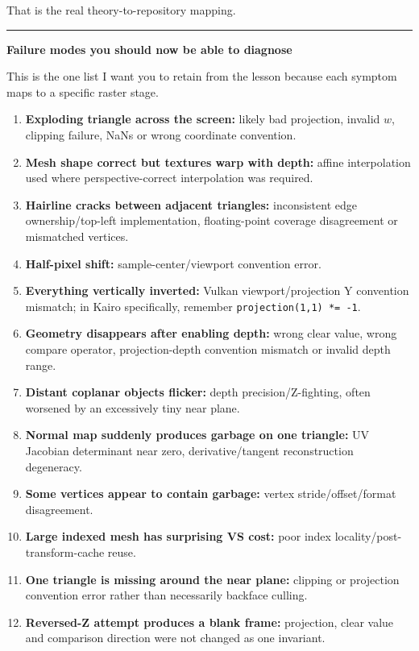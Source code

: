 That is the real theory-to-repository mapping.

\begin{center}\rule{0.5\linewidth}{0.5pt}\end{center}

\textbf{Failure modes you should now be able to diagnose}

This is the one list I want you to retain from the lesson because each symptom maps to a specific raster stage.

\begin{enumerate}
\def\labelenumi{\arabic{enumi}.}
\tightlist
\item
  \textbf{Exploding triangle across the screen:} likely bad projection, invalid \(w\), clipping failure, NaNs or wrong coordinate convention.
\item
  \textbf{Mesh shape correct but textures warp with depth:} affine interpolation used where perspective-correct interpolation was required.
\item
  \textbf{Hairline cracks between adjacent triangles:} inconsistent edge ownership/top-left implementation, floating-point coverage disagreement or mismatched vertices.
\item
  \textbf{Half-pixel shift:} sample-center/viewport convention error.
\item
  \textbf{Everything vertically inverted:} Vulkan viewport/projection Y convention mismatch; in Kairo specifically, remember \texttt{projection(1,1)\ *=\ -1}.
\item
  \textbf{Geometry disappears after enabling depth:} wrong clear value, wrong compare operator, projection-depth convention mismatch or invalid depth range.
\item
  \textbf{Distant coplanar objects flicker:} depth precision/Z-fighting, often worsened by an excessively tiny near plane.
\item
  \textbf{Normal map suddenly produces garbage on one triangle:} UV Jacobian determinant near zero, derivative/tangent reconstruction degeneracy.
\item
  \textbf{Some vertices appear to contain garbage:} vertex stride/offset/format disagreement.
\item
  \textbf{Large indexed mesh has surprising VS cost:} poor index locality/post-transform-cache reuse.
\item
  \textbf{One triangle is missing around the near plane:} clipping or projection convention error rather than necessarily backface culling.
\item
  \textbf{Reversed-Z attempt produces a blank frame:} projection, clear value and comparison direction were not changed as one invariant.
\end{enumerate}

